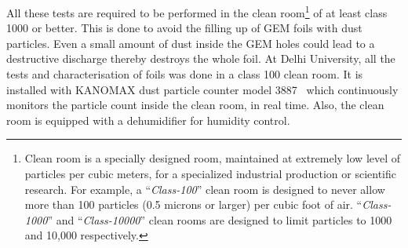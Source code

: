 
All these tests are required to be performed in the clean room\footnote{Clean room is a specially designed room, maintained at extremely low level of particles per cubic meters, for a specialized industrial production or scientific research. For example, a ``\textit{Class-100}'' clean room is designed to never allow more than 100 particles (0.5 microns or larger) per cubic foot of air. ``\textit{Class-1000}'' and ``\textit{Class-10000}'' clean rooms are designed to limit particles to 1000 and 10,000 respectively.} of at least class 1000 or better.
This is done to avoid the filling up of GEM foils with dust particles.
Even a small amount of dust inside the GEM holes could lead to a destructive discharge thereby destroys the whole foil.
At Delhi University, all the tests and characterisation of foils was done in a class 100 clean room. It is installed with KANOMAX dust particle counter model 3887~\cite{KANOMAX-dust-particle-counter} which continuously monitors the particle count inside the clean room, in real time.
Also, the clean room is equipped with a dehumidifier for humidity control.


